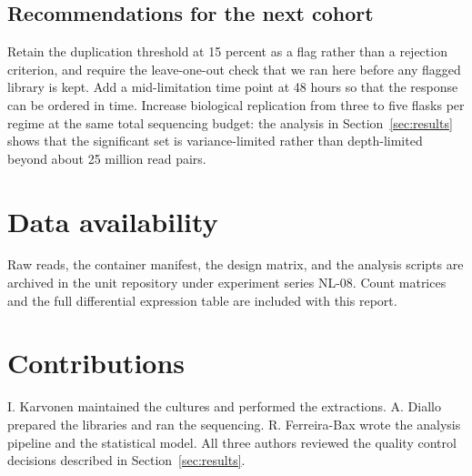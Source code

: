 \subsection{Recommendations for the next cohort}

Retain the duplication threshold at 15 percent as a flag rather than a
rejection criterion, and require the leave-one-out check that we ran here
before any flagged library is kept. Add a mid-limitation time point at 48 hours
so that the response can be ordered in time. Increase biological replication
from three to five flasks per regime at the same total sequencing budget: the
analysis in Section~\ref{sec:results} shows that the significant set is
variance-limited rather than depth-limited beyond about 25 million read pairs.

\section*{Data availability}

Raw reads, the container manifest, the design matrix, and the analysis scripts
are archived in the unit repository under experiment series NL-08. Count
matrices and the full differential expression table are included with this
report.

\section*{Contributions}

I. Karvonen maintained the cultures and performed the extractions.
A. Diallo prepared the libraries and ran the sequencing.
R. Ferreira-Bax wrote the analysis pipeline and the statistical model. All
three authors reviewed the quality control decisions described in
Section~\ref{sec:results}.
